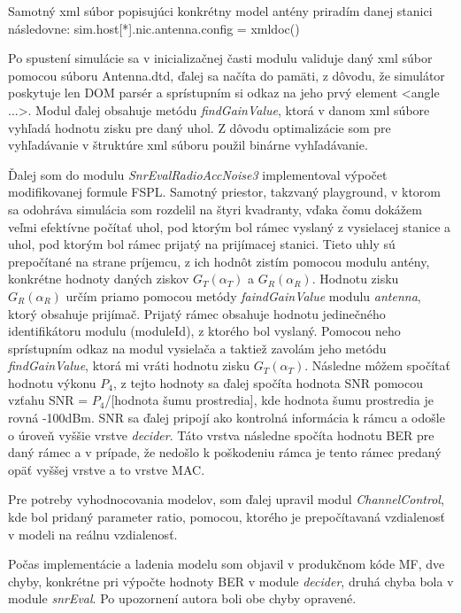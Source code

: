 \documentclass[11pt,twoside,a4paper]{book}
\begin{document}
Samotný xml súbor popisujúci konkrétny model antény priradím danej stanici následovne: sim.host[*].nic.antenna.config = xmldoc()

Po spustení simulácie sa v inicializačnej časti modulu validuje daný xml súbor pomocou súboru Antenna.dtd, ďalej sa načíta do pamäti, z dôvodu, že simulátor poskytuje len DOM parsér a sprístupním si odkaz na jeho prvý element <angle ...>. Modul ďalej obsahuje metódu \textit{findGainValue}, ktorá v danom xml súbore vyhľadá hodnotu zisku pre daný uhol. Z dôvodu optimalizácie som pre vyhľadávanie v štruktúre xml súboru použil binárne vyhľadávanie.

Ďalej som do modulu \textit{SnrEvalRadioAccNoise3} implementoval výpočet modifikovanej formule FSPL. Samotný priestor, takzvaný playground, v ktorom sa odohráva simulácia som rozdelil na štyri kvadranty, vďaka čomu dokážem veľmi efektívne počítať uhol, pod ktorým bol rámec vyslaný z vysielacej stanice a uhol, pod ktorým bol rámec prijatý na prijímacej stanici. Tieto uhly sú prepočítané na strane príjemcu, z ich hodnôt zistím pomocou modulu antény, konkrétne hodnoty daných ziskov $G_{T}(\alpha_{T})$ a $G_{R}(\alpha_{R})$. Hodnotu zisku $G_{R}(\alpha_{R})$ určím priamo pomocou metódy \textit{faindGainValue} modulu \textit{antenna}, ktorý obsahuje prijímač. Prijatý rámec obsahuje hodnotu jedinečného identifikátoru modulu (moduleId), z ktorého bol vyslaný. Pomocou neho sprístupním odkaz na modul vysielača a taktiež zavolám jeho metódu \textit{findGainValue}, ktorá mi vráti hodnotu zisku $G_{T}(\alpha_{T})$. Následne môžem spočítať hodnotu výkonu $P_4$, z tejto hodnoty sa ďalej spočíta hodnota SNR pomocou vzťahu SNR = $P_4$/[hodnota šumu prostredia], kde hodnota šumu prostredia je rovná -100dBm. SNR sa ďalej pripojí ako kontrolná informácia k rámcu a odošle o úroveň vyššie vrstve \textit{decider}. Táto vrstva následne spočíta hodnotu BER pre daný rámec a v prípade, že nedošlo k poškodeniu rámca je tento rámec predaný opäť vyššej vrstve a to vrstve MAC.

Pre potreby vyhodnocovania modelov, som ďalej upravil modul \textit{ChannelControl}, kde bol pridaný parameter ratio, pomocou, ktorého je prepočítavaná vzdialenosť v modeli na reálnu vzdialenosť.

Počas implementácie a ladenia modelu som objavil v produkčnom kóde MF, dve chyby, konkrétne pri výpočte hodnoty BER v module \textit{decider}, druhá chyba bola v module \textit{snrEval}. Po upozornení autora boli obe chyby opravené.
\end{document}
